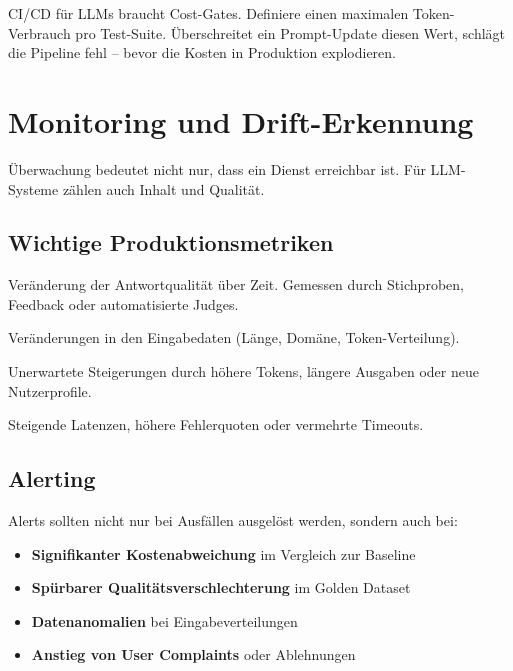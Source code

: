 \begin{praxishinweis}
CI/CD für LLMs braucht Cost-Gates. Definiere einen maximalen Token-Verbrauch pro Test-Suite. Überschreitet ein Prompt-Update diesen Wert, schlägt die Pipeline fehl -- bevor die Kosten in Produktion explodieren.
\end{praxishinweis}

\section{Monitoring und Drift-Erkennung}

Überwachung bedeutet nicht nur, dass ein Dienst erreichbar ist. Für LLM-Systeme zählen auch Inhalt und Qualität.

\subsection{Wichtige Produktionsmetriken}

\begin{description}[leftmargin=*,style=nextline]
    \item[Qualitäts-Drift] Veränderung der Antwortqualität über Zeit. Gemessen durch Stichproben, Feedback oder automatisierte Judges.
    \item[Daten-Drift] Veränderungen in den Eingabedaten (Länge, Domäne, Token-Verteilung).
    \item[Kosten-Drift] Unerwartete Steigerungen durch höhere Tokens, längere Ausgaben oder neue Nutzerprofile.
    \item[Performance-Drift] Steigende Latenzen, höhere Fehlerquoten oder vermehrte Timeouts.
\end{description}

\subsection{Alerting}

Alerts sollten nicht nur bei Ausfällen ausgelöst werden, sondern auch bei:

\begin{itemize}[leftmargin=*]
    \item \textbf{Signifikanter Kostenabweichung} im Vergleich zur Baseline
    \item \textbf{Spürbarer Qualitätsverschlechterung} im Golden Dataset
    \item \textbf{Datenanomalien} bei Eingabeverteilungen
    \item \textbf{Anstieg von User Complaints} oder Ablehnungen
\end{itemize}

